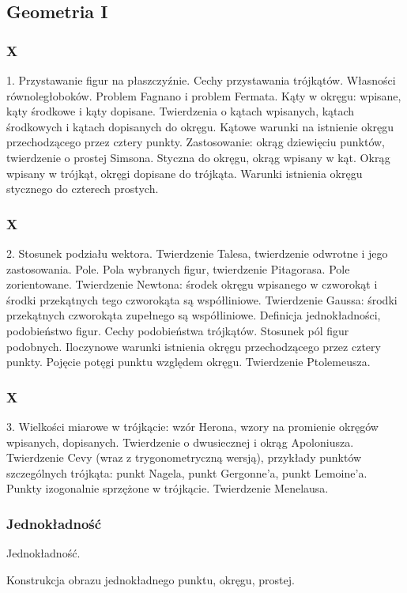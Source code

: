 \subsection{Geometria I}
\subsubsection{X}
1. Przystawanie figur na płaszczyźnie. Cechy przystawania trójkątów. Własności równoległoboków. Problem Fagnano i problem Fermata. Kąty w okręgu: wpisane, kąty środkowe i kąty dopisane. Twierdzenia o kątach wpisanych, kątach środkowych i kątach dopisanych do okręgu. Kątowe warunki na istnienie okręgu przechodzącego przez cztery punkty. Zastosowanie: okrąg dziewięciu punktów, twierdzenie o prostej Simsona. Styczna do okręgu, okrąg wpisany w kąt. Okrąg wpisany w trójkąt, okręgi dopisane do trójkąta. Warunki istnienia okręgu stycznego do czterech prostych.

\subsubsection{X}
2. Stosunek podziału wektora. Twierdzenie Talesa, twierdzenie odwrotne i jego zastosowania. Pole. Pola wybranych figur, twierdzenie Pitagorasa. Pole zorientowane. Twierdzenie Newtona: środek okręgu wpisanego w czworokąt i środki przekątnych tego czworokąta są współliniowe. Twierdzenie Gaussa: środki przekątnych czworokąta zupełnego są współliniowe. Definicja jednokładności, podobieństwo figur. Cechy podobieństwa trójkątów. Stosunek pól figur podobnych. Iloczynowe warunki istnienia okręgu przechodzącego przez cztery punkty. Pojęcie potęgi punktu
względem okręgu. Twierdzenie Ptolemeusza.

\subsubsection{X}
3. Wielkości miarowe w trójkącie: wzór Herona, wzory na promienie okręgów wpisanych, dopisanych. Twierdzenie o dwusiecznej i okrąg Apoloniusza. Twierdzenie Cevy (wraz z trygonometryczną wersją), przykłady punktów szczególnych trójkąta: punkt Nagela, punkt Gergonne'a, punkt Lemoine'a. Punkty izogonalnie sprzężone w trójkącie. Twierdzenie Menelausa.

\subsubsection{Jednokładność}
Jednokładność.

Konstrukcja obrazu jednokładnego punktu, okręgu, prostej.

